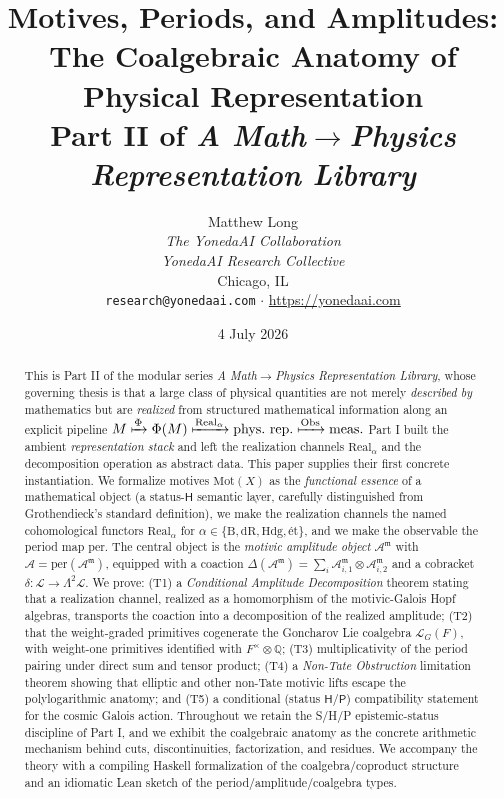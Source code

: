 \documentclass[12pt]{article}
\title{\bfseries Motives, Periods, and Amplitudes:\\ The Coalgebraic Anatomy of Physical Representation\\[4pt]
\large Part II of \emph{A Math$\rightarrow$Physics Representation Library}}
\author{Matthew Long \\
\textit{The YonedaAI Collaboration} \\
\textit{YonedaAI Research Collective} \\
Chicago, IL \\
\texttt{research@yonedaai.com} $\cdot$ \url{https://yonedaai.com}}
\date{4 July 2026}
\theoremstyle{definition}
\theoremstyle{remark}
\newcommand{\Mot}{\mathrm{Mot}}
\newcommand{\Real}{\mathrm{Real}}
\newcommand{\Obs}{\mathrm{Obs}}
\newcommand{\per}{\mathrm{per}}
\newcommand{\Am}{\mathcal{A}}
\newcommand{\Amm}{\mathcal{A}^{\mathfrak{m}}}
\newcommand{\Lie}{\mathcal{L}}
\newcommand{\LG}{\mathcal{L}_{G}}
\newcommand{\Betti}{\mathrm{B}}
\newcommand{\dR}{\mathrm{dR}}
\newcommand{\Hdg}{\mathrm{Hdg}}
\newcommand{\et}{\text{\'et}}
\newcommand{\coA}{\Delta}
\newcommand{\cobr}{\delta}
\newcommand{\Qbb}{\mathbb{Q}}
\newcommand{\Hlab}{\ensuremath{\mathsf{H}}}
\newcommand{\Plab}{\ensuremath{\mathsf{P}}}
\begin{document}
\maketitle

\begin{abstract}
This is Part II of the modular series \emph{A Math$\rightarrow$Physics Representation Library}, whose governing thesis is that a large class of physical quantities are not merely \emph{described by} mathematics but are \emph{realized} from structured mathematical information along an explicit pipeline
$M \xmapsto{\Phi} \Phi(M) \xmapsto{\Real_\alpha} \text{phys.\ rep.} \xmapsto{\Obs} \text{meas.}$
Part I built the ambient \emph{representation stack} and left the realization channels $\Real_\alpha$ and the decomposition operation as abstract data. This paper supplies their first concrete instantiation. We formalize motives $\Mot(X)$ as the \emph{functional essence} of a mathematical object (a status-\Hlab{} semantic layer, carefully distinguished from Grothendieck's standard definition), we make the realization channels the named cohomological functors $\Real_\alpha$ for $\alpha \in \{\Betti,\dR,\Hdg,\et\}$, and we make the observable the period map $\per$. The central object is the \emph{motivic amplitude object} $\Amm$ with $\Am = \per(\Amm)$, equipped with a coaction $\coA(\Amm) = \sum_i \Amm_{i,1}\otimes \Amm_{i,2}$ and a cobracket $\cobr\colon \Lie \to \Lambda^2\Lie$. We prove: (T1) a \emph{Conditional Amplitude Decomposition} theorem stating that a realization channel, realized as a homomorphism of the motivic-Galois Hopf algebras, transports the coaction into a decomposition of the realized amplitude; (T2) that the weight-graded primitives cogenerate the Goncharov Lie coalgebra $\LG(F)$, with weight-one primitives identified with $F^\times\otimes\Qbb$; (T3) multiplicativity of the period pairing under direct sum and tensor product; (T4) a \emph{Non-Tate Obstruction} limitation theorem showing that elliptic and other non-Tate motivic lifts escape the polylogarithmic anatomy; and (T5) a conditional (status \Hlab/\Plab) compatibility statement for the cosmic Galois action. Throughout we retain the S/H/P epistemic-status discipline of Part I, and we exhibit the coalgebraic anatomy as the concrete arithmetic mechanism behind cuts, discontinuities, factorization, and residues. We accompany the theory with a compiling Haskell formalization of the coalgebra/coproduct structure and an idiomatic Lean sketch of the period/amplitude/coalgebra types.
\end{abstract}
\end{document}
